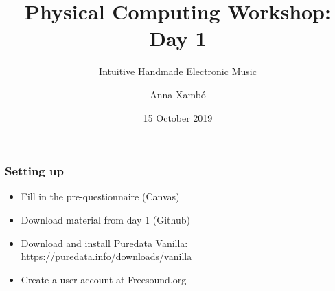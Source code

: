 \documentclass[screen, aspectratio=43]{beamer}
\title[PCW-d1]{Physical Computing Workshop: Day 1}
\subtitle{Intuitive Handmade Electronic Music}
\author[A. Xamb{\'o}]{Anna Xamb{\'o}}
\institute[NTNU]{Department of Music, NTNU}
\date{15 October 2019}
\begin{document}
\begin{frame}
  \titlepage
\end{frame}
%
\begin{frame}
\frametitle{Setting up}
\begin{itemize}
\item Fill in the pre-questionnaire (Canvas)
\item Download material from day 1 (Github)
\item Download and install Puredata Vanilla: \url{https://puredata.info/downloads/vanilla}
\item Create a user account at Freesound.org
\end{itemize}
\end{frame}
%
%
%
\end{document}
